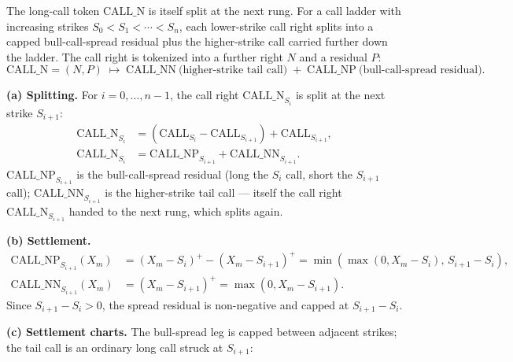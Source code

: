 \documentclass[11pt]{article}
\newcommand{\pos}[1]{\left(#1\right)^+}
\newcommand{\Call}{\mathrm{CALL}}
\newcommand{\CN}{\mathrm{CALL\_N}}
\newcommand{\CNP}{\mathrm{CALL\_NP}}
\newcommand{\CNN}{\mathrm{CALL\_NN}}
\newcommand{\CNat}[1]{\mathrm{CALL\_N}_{#1}}
\newcommand{\CNPi}[1]{\mathrm{CALL\_NP}_{#1}}
\newcommand{\CNNi}[1]{\mathrm{CALL\_NN}_{#1}}
\begin{document}
The long-call token $\CN$ is itself split at the next rung. For a call ladder with
increasing strikes $S_0<S_1<\cdots<S_n$, each lower-strike call right splits into a capped
bull-call-spread residual plus the higher-strike call carried further down the ladder. The
call right is tokenized into a further right $N$ and a residual $P$:
\[
\CN = (N,P) \;\longmapsto\; \CNN\ \text{(higher-strike tail call)} \;+\; \CNP\ \text{(bull-call-spread residual)} .
\]

\textbf{(a) Splitting.} For $i=0,\dots,n-1$, the call right $\CNat{S_i}$ is split at the
next strike $S_{i+1}$:
\begin{align}
\CNat{S_i} &=(\Call_{S_i}-\Call_{S_{i+1}})+\Call_{S_{i+1}},\\
\CNat{S_i} &=\CNPi{S_{i+1}}+\CNNi{S_{i+1}}.
\end{align}
$\CNPi{S_{i+1}}$ is the bull-call-spread residual (long the $S_i$ call, short the
$S_{i+1}$ call); $\CNNi{S_{i+1}}$ is the higher-strike tail call --- itself the call
right $\CNat{S_{i+1}}$ handed to the next rung, which splits again.

\textbf{(b) Settlement.}
\begin{align}
\CNPi{S_{i+1}}(X_m) &=\pos{X_m-S_i}-\pos{X_m-S_{i+1}}
=\min\!\left(\max(0,X_m-S_i),\,S_{i+1}-S_i\right),\\
\CNNi{S_{i+1}}(X_m) &=\pos{X_m-S_{i+1}}=\max(0,X_m-S_{i+1}).
\end{align}
Since $S_{i+1}-S_i>0$, the spread residual is non-negative and capped at $S_{i+1}-S_i$.

\textbf{(c) Settlement charts.} The bull-spread leg is capped between adjacent strikes; the
tail call is an ordinary long call struck at $S_{i+1}$:

\begin{center}
\hspace{0.9cm}
\end{center}
\end{document}
